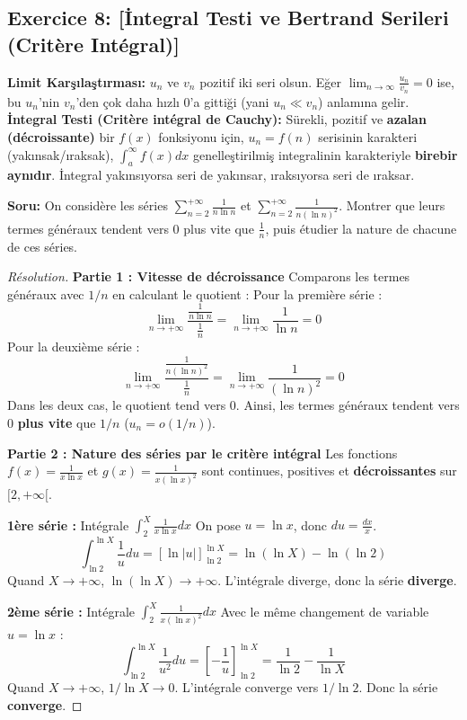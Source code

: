 \documentclass[12pt,a4paper]{report}
\begin{document}
\subsection*{Exercice 8: [İntegral Testi ve Bertrand Serileri (Critère Intégral)]}

\begin{tcolorbox}[colback=brown!5!white,colframe=brown!75!black,title=Hatırlatma (Rappel): İntegral Testi ve Limit Karşılaştırması]
\textbf{Limit Karşılaştırması:} $u_n$ ve $v_n$ pozitif iki seri olsun. Eğer $\lim_{n \to \infty} \frac{u_n}{v_n} = 0$ ise, bu $u_n$'nin $v_n$'den çok daha hızlı 0'a gittiği (yani $u_n \ll v_n$) anlamına gelir. \newline
\textbf{İntegral Testi (Critère intégral de Cauchy):} Sürekli, pozitif ve \textbf{azalan (décroissante)} bir $f(x)$ fonksiyonu için, $u_n = f(n)$ serisinin karakteri (yakınsak/ıraksak), $\int_a^\infty f(x) dx$ genelleştirilmiş integralinin karakteriyle \textbf{birebir aynıdır}. İntegral yakınsıyorsa seri de yakınsar, ıraksıyorsa seri de ıraksar.
\end{tcolorbox}

\textbf{Soru:}
On considère les séries $\sum_{n=2}^{+\infty} \frac{1}{n \ln n}$ et $\sum_{n=2}^{+\infty} \frac{1}{n(\ln n)^2}$. Montrer que leurs termes généraux tendent vers 0 plus vite que $\frac{1}{n}$, puis étudier la nature de chacune de ces séries.

\begin{proof}[Résolution]
\textbf{Partie 1 : Vitesse de décroissance}
Comparons les termes généraux avec $1/n$ en calculant le quotient :
Pour la première série :
\[ \lim_{n \to +\infty} \frac{\frac{1}{n \ln n}}{\frac{1}{n}} = \lim_{n \to +\infty} \frac{1}{\ln n} = 0 \]
Pour la deuxième série :
\[ \lim_{n \to +\infty} \frac{\frac{1}{n (\ln n)^2}}{\frac{1}{n}} = \lim_{n \to +\infty} \frac{1}{(\ln n)^2} = 0 \]
Dans les deux cas, le quotient tend vers 0. Ainsi, les termes généraux tendent vers 0 \textbf{plus vite} que $1/n$ ($u_n = o(1/n)$).

\textbf{Partie 2 : Nature des séries par le critère intégral}
Les fonctions $f(x) = \frac{1}{x \ln x}$ et $g(x) = \frac{1}{x (\ln x)^2}$ sont continues, positives et \textbf{décroissantes} sur $[2, +\infty[$.

\textbf{1ère série :} Intégrale $\int_2^X \frac{1}{x \ln x} dx$
On pose $u = \ln x$, donc $du = \frac{dx}{x}$.
\[ \int_{\ln 2}^{\ln X} \frac{1}{u} du = [\ln |u|]_{\ln 2}^{\ln X} = \ln(\ln X) - \ln(\ln 2) \]
Quand $X \to +\infty$, $\ln(\ln X) \to +\infty$. L'intégrale diverge, donc la série \textbf{diverge}.

\textbf{2ème série :} Intégrale $\int_2^X \frac{1}{x (\ln x)^2} dx$
Avec le même changement de variable $u = \ln x$ :
\[ \int_{\ln 2}^{\ln X} \frac{1}{u^2} du = \left[ -\frac{1}{u} \right]_{\ln 2}^{\ln X} = \frac{1}{\ln 2} - \frac{1}{\ln X} \]
Quand $X \to +\infty$, $1/\ln X \to 0$. L'intégrale converge vers $1/\ln 2$. Donc la série \textbf{converge}.
\end{proof}
\end{document}
